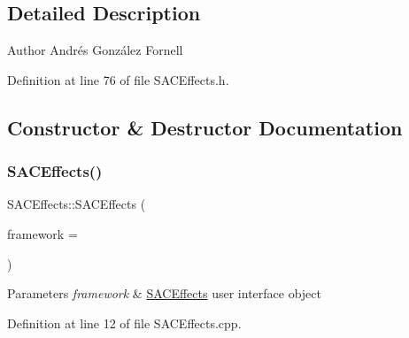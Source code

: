\subsection{Detailed Description}
\begin{DoxyAuthor}{Author}
Andrés González Fornell 
\end{DoxyAuthor}


Definition at line 76 of file S\+A\+C\+Effects.\+h.



\subsection{Constructor \& Destructor Documentation}
\mbox{\label{class_s_a_c_effects_aad64fe6a36a53d1ffeae59bccbd8af33}} 
\subsubsection{\texorpdfstring{S\+A\+C\+Effects()}{SACEffects()}}
{\footnotesize\ttfamily S\+A\+C\+Effects\+::\+S\+A\+C\+Effects (\begin{DoxyParamCaption}\item[{Q\+Widget $\ast$}]{framework = {} }\end{DoxyParamCaption})\hspace{0.3cm}{\ttfamily [explicit]}}


\begin{DoxyParams}{Parameters}
{\em framework} & \hyperlink{class_s_a_c_effects}{S\+A\+C\+Effects} user interface object \\
\hline
\end{DoxyParams}


Definition at line 12 of file S\+A\+C\+Effects.\+cpp.

